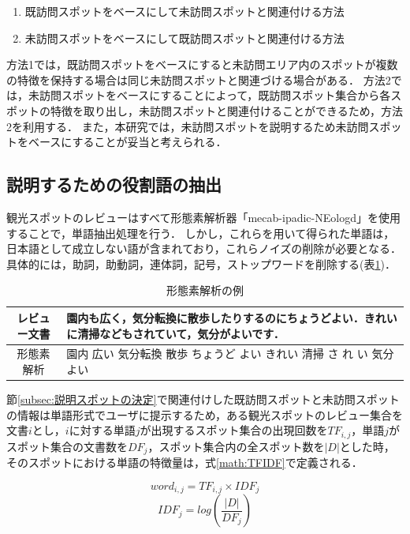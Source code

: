 \documentclass{deimj}
\begin{document}
\begin{enumerate}
  \item 既訪問スポットをベースにして未訪問スポットと関連付ける方法
  \item 未訪問スポットをベースにして既訪問スポットと関連付ける方法
\end{enumerate}

方法1では，既訪問スポットをベースにすると未訪問エリア内のスポットが複数の特徴を保持する場合は同じ未訪問スポットと関連づける場合がある．
方法2では，未訪問スポットをベースにすることによって，既訪問スポット集合から各スポットの特徴を取り出し，未訪問スポットと関連付けることができるため，方法2を利用する．
また，本研究では，未訪問スポットを説明するため未訪問スポットをベースにすることが妥当と考えられる．

\subsection{説明するための役割語の抽出}
\label{subsec:説明するための役割語の抽出}
観光スポットのレビューはすべて形態素解析器「mecab-ipadic-NEologd」を使用することで，単語抽出処理を行う．
しかし，これらを用いて得られた単語は，日本語として成立しない語が含まれており，これらノイズの削除が必要となる．
具体的には，助詞，助動詞，連体詞，記号，ストップワードを削除する(表\ref{table:mecab})．

\begin{table}[t]
  \caption{形態素解析の例}
  \label{table:mecab}
  \centering
    \begin{tabular}{c|p{}} \hline
      レビュー文書 & 園内も広く，気分転換に散歩したりするのにちょうどよい．きれいに清掃などもされていて，気分がよいです．\\
      \hline
      形態素解析 & 園内 広い 気分転換 散歩 ちょうど よい きれい 清掃 さ れ い 気分 よい\\
      \hline
    \end{tabular}
\end{table}

節\ref{subsec:説明スポットの決定}で関連付けした既訪問スポットと未訪問スポットの情報は単語形式でユーザに提示するため，ある観光スポットのレビュー集合を文書$i$とし，$i$に対する単語$j$が出現するスポット集合の出現回数を$TF_{i,j}$，単語$j$がスポット集合の文書数を$DF_{j}$，スポット集合内の全スポット数を$|D|$とした時，そのスポットにおける単語の特徴量は，式\ref{math:TFIDF}で定義される．

\begin{equation}
  word_{i,j} = TF_{i,j} \times IDF_{j}
  \label{math:TFIDF}
\end{equation}
\begin{equation}
  IDF_{j} = log(\frac{|D|}{DF_{j}})
  \label{math:IDF}
\end{equation}
\end{document}
